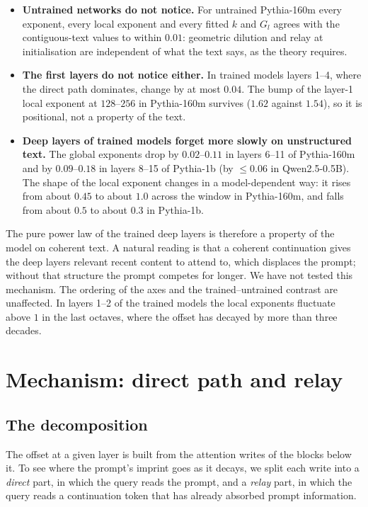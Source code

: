 \documentclass[11pt]{article}
\theoremstyle{definition}
\theoremstyle{remark}
\begin{document}
\begin{itemize}
  \item \textbf{Untrained networks do not notice.} For untrained Pythia-160m every exponent, every local exponent and every fitted $k$ and $G_l$ agrees with the contiguous-text values to within $0.01$: geometric dilution and relay at initialisation are independent of what the text says, as the theory requires.
  \item \textbf{The first layers do not notice either.} In trained models layers 1--4, where the direct path dominates, change by at most $0.04$. The bump of the layer-1 local exponent at $128$--$256$ in Pythia-160m survives ($1.62$ against $1.54$), so it is positional, not a property of the text.
  \item \textbf{Deep layers of trained models forget more slowly on unstructured text.} The global exponents drop by $0.02$--$0.11$ in layers 6--11 of Pythia-160m and by $0.09$--$0.18$ in layers 8--15 of Pythia-1b (by $\le0.06$ in Qwen2.5-0.5B). The shape of the local exponent changes in a model-dependent way: it rises from about $0.45$ to about $1.0$ across the window in Pythia-160m, and falls from about $0.5$ to about $0.3$ in Pythia-1b.
\end{itemize}

The pure power law of the trained deep layers is therefore a property of the model on coherent text. A natural reading is that a coherent continuation gives the deep layers relevant recent content to attend to, which displaces the prompt; without that structure the prompt competes for longer. We have not tested this mechanism. The ordering of the axes and the trained--untrained contrast are unaffected. In layers 1--2 of the trained models the local exponents fluctuate above $1$ in the last octaves, where the offset has decayed by more than three decades.

\section{Mechanism: direct path and relay}\label{sec:mechanism}
\subsection{The decomposition}\label{sec:mech-decomp}

The offset at a given layer is built from the attention writes of the blocks below it. To see where the prompt's imprint goes as it decays, we split each write into a \emph{direct} part, in which the query reads the prompt, and a \emph{relay} part, in which the query reads a continuation token that has already absorbed prompt information.
\end{document}
